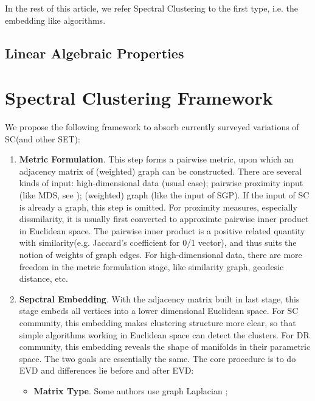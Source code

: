 In the rest of this article, we refer Spectral Clustering to the 
first type, i.e. the embedding like algorithms. 


\subsection{Linear Algebraic Properties}



\section{Spectral Clustering Framework}
\label{sec:framework}

We propose the following framework to absorb currently 
surveyed variations of SC(and other SET):
\begin{enumerate}
	\item \textbf{Metric Formulation}. 
		This step forms a pairwise metric, upon which 
		an adjacency matrix of (weighted) graph can be 
		constructed. 
		There are several kinds of 
		input: high-dimensional data (usual case); pairwise proximity  
		input (like MDS, see \rsec{\ref{sec:mds}}); (weighted) graph
		(like the input of SGP). 
		If the input of SC is already a graph, 
		this step is omitted.
		For proximity measures, especially dissmilarity, it is 
		usually first converted to approximte pairwise inner product in 
		Euclidean space. The pairwise inner product is a positive 
		related quantity with similarity(e.g. Jaccard's coefficient 
		for 0/1 vector\cite{wiki_jaccard}), and thus suits the notion 
		of weights of graph edges. For high-dimensional data, there are 
		more freedom in the metric formulation stage, like 
		similarity graph\cite{von2007tutorial}, geodesic 
		distance\cite{tenenbaum2000isomap}, etc. 
	\item \textbf{Sepctral Embedding}. 
		With the adjacency matrix built in last stage, 
		this stage embeds all vertices into a lower dimensional 
		Euclidean space. For SC community, this embedding 
		makes clustering structure more clear, so that 
		simple algorithms working in Euclidean space can detect 
		the clusters. For DR community, this embedding reveals 
		the shape of manifolds in their parametric space. 
		The two goals are essentially the same. The core procedure 
		is to do EVD and differences 
		lie before and after EVD:
			\begin{itemize}
				\item \textbf{Matrix Type}. Some authors use
					graph Laplacian
					\cite{von2007tutorial,belkin2003laplacian,shi2000normalized} ;

\end{itemize}
\end{enumerate}
